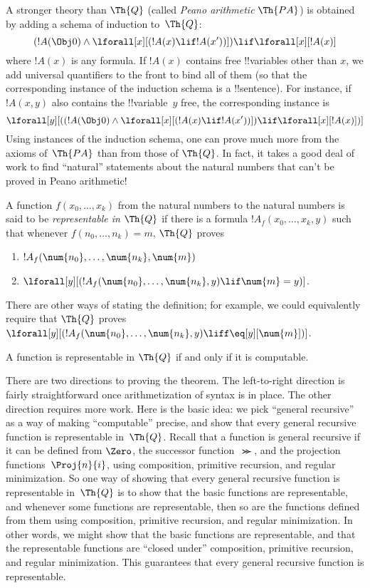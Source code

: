 \documentclass[../../../include/open-logic-section]{subfiles}
\begin{document}
A stronger theory than $\Th{Q}$ (called \emph{Peano arithmetic} $\Th{PA}$)
is obtained by adding a schema of induction to~$\Th{Q}$:
\[
(!A(\Obj 0) \land \lforall[x][(!A(x) \lif !A(x'))]) \lif \lforall[x][!A(x)]
\]
where $!A(x)$ is any formula. If $!A(x)$ contains free !!{variable}s
other than $x$, we add universal quantifiers to the front to bind all
of them (so that the corresponding instance of the induction schema is
a !!{sentence}). For instance, if $!A(x, y)$ also contains the
!!{variable}~$y$ free, the corresponding instance is
\[
\lforall[y][((!A(\Obj 0) \land \lforall[x][(!A(x) \lif !A(x'))]) \lif
  \lforall[x][!A(x)])]
\]
Using instances of the induction schema, one can prove much more from
the axioms of~$\Th{PA}$ than from those of $\Th{Q}$. In fact, it takes
a good deal of work to find ``natural'' statements about the natural
numbers that can't be proved in Peano arithmetic!{}

\begin{defn}
  A function $f(x_0,\ldots,x_k)$ from the natural numbers to
  the natural numbers is said to be {\em representable in $\Th{Q}$} if
  there is a formula $!A_f(x_0,\dots,x_k,y)$ such that whenever
  $f(n_0,\dots,n_k) = m$, $\Th{Q}$ proves
\begin{enumerate}
\item $!A_f(\num{n_0}, \dots, \num{n_k}, \num{m})$
\item $\lforall[y][(!A_f(\num{n_0}, \dots, \num{n_k}, y) \lif \num{m} = y)]$.
\end{enumerate}
\end{defn}

There are other ways of stating the definition; for example, we could
equivalently require that $\Th{Q}$ proves $\lforall[y][(!A_f(\num{n_0}, \dots,
\num{n_k}, y) \liff \eq[y][\num{m}])]$.

\begin{thm}
A function is representable in $\Th{Q}$ if and only if it is computable.
\end{thm}

There are two directions to proving the theorem. The left-to-right
direction is fairly straightforward once arithmetization of syntax is
in place. The other direction requires more work.  Here is the basic
idea: we pick ``general recursive'' as a way of making ``computable''
precise, and show that every general recursive function is
representable in~$\Th{Q}$. Recall that a function is general recursive
if it can be defined from $\Zero$, the successor function~$\Succ$, and the
projection functions~$\Proj{n}{i}$, using composition, primitive recursion,
and regular minimization. So one way of showing that every general
recursive function is representable in~$\Th{Q}$ is to show that the
basic functions are representable, and whenever some functions are
representable, then so are the functions defined from them using
composition, primitive recursion, and regular minimization. In other
words, we might show that the basic functions are representable, and
that the representable functions are ``closed under'' composition,
primitive recursion, and regular minimization.  This guarantees that
every general recursive function is representable.
\end{document}
